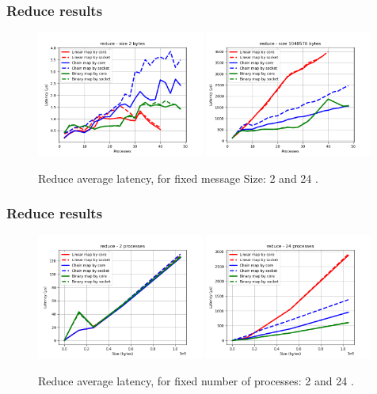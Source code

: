 \documentclass{beamer}
\begin{document}
\begin{frame}
    \frametitle{Reduce results}
    
    \begin{figure}
        \centering
        \includegraphics[width=0.49\textwidth]{../../plots/reduce_fixedSize2.png}
        \includegraphics[width=0.49\textwidth]{../../plots/reduce_fixedSize1048576.png}
        \caption{Reduce average latency, for fixed message Size: 2 and 24 .}
    \end{figure}
    
\end{frame}


\begin{frame}
    \frametitle{Reduce results}
    
    \begin{figure}
        \centering
        \includegraphics[width=0.49\textwidth]{../../plots/reduce_fixedprocesses2.png}
        \includegraphics[width=0.49\textwidth]{../../plots/reduce_fixedprocesses24.png}
        \caption{Reduce average latency, for fixed number of processes: 2 and 24 .}
    \end{figure}
    
\end{frame}
\end{document}

